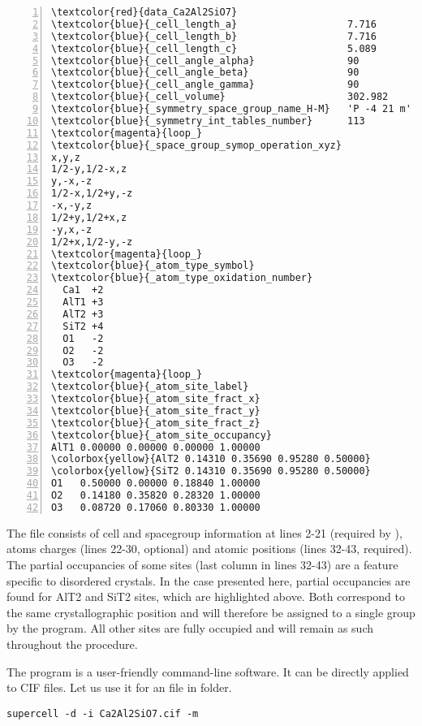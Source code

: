 \documentclass[a4paper,10pt]{article}
\begin{document}
\begin{Verbatim}[commandchars=\\\{\}, numbers=left]
\textcolor{red}{data_Ca2Al2SiO7}
\textcolor{blue}{_cell_length_a}                   7.716
\textcolor{blue}{_cell_length_b}                   7.716
\textcolor{blue}{_cell_length_c}                   5.089
\textcolor{blue}{_cell_angle_alpha}                90
\textcolor{blue}{_cell_angle_beta}                 90
\textcolor{blue}{_cell_angle_gamma}                90
\textcolor{blue}{_cell_volume}                     302.982
\textcolor{blue}{_symmetry_space_group_name_H-M}   'P -4 21 m'
\textcolor{blue}{_symmetry_int_tables_number}      113
\textcolor{magenta}{loop_}
\textcolor{blue}{_space_group_symop_operation_xyz}
x,y,z
1/2-y,1/2-x,z
y,-x,-z
1/2-x,1/2+y,-z
-x,-y,z
1/2+y,1/2+x,z
-y,x,-z
1/2+x,1/2-y,-z
\textcolor{magenta}{loop_}
\textcolor{blue}{_atom_type_symbol}
\textcolor{blue}{_atom_type_oxidation_number}
  Ca1  +2
  AlT1 +3
  AlT2 +3
  SiT2 +4
  O1   -2
  O2   -2
  O3   -2
\textcolor{magenta}{loop_}
\textcolor{blue}{_atom_site_label}
\textcolor{blue}{_atom_site_fract_x}
\textcolor{blue}{_atom_site_fract_y}
\textcolor{blue}{_atom_site_fract_z}
\textcolor{blue}{_atom_site_occupancy}
AlT1 0.00000 0.00000 0.00000 1.00000
\colorbox{yellow}{AlT2 0.14310 0.35690 0.95280 0.50000}
\colorbox{yellow}{SiT2 0.14310 0.35690 0.95280 0.50000}
O1   0.50000 0.00000 0.18840 1.00000
O2   0.14180 0.35820 0.28320 1.00000
O3   0.08720 0.17060 0.80330 1.00000
\end{Verbatim}

The file consists of cell and spacegroup information at lines 2-21 (required by \sups{}), atoms charges (lines 22-30, optional) and atomic positions (lines 32-43, required). The partial occupancies of some sites (last column in lines 32-43) are a feature specific to disordered crystals. In the case presented here, partial occupancies are found for AlT2 and SiT2 sites, which are highlighted above. Both correspond to the same crystallographic position and will therefore be assigned to a single group by the \sups{} program. All other sites are fully occupied and will remain as such throughout the procedure.

The \sups{} program is a user-friendly command-line software. It can be directly applied to CIF files. Let us use it for an  file in 
 folder.
\begin{Verbatim}[breaklines]
supercell -d -i Ca2Al2SiO7.cif -m
\end{Verbatim}
\end{document}
